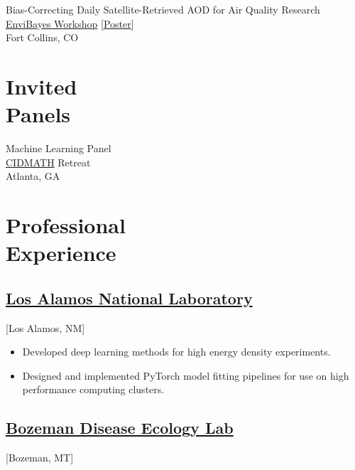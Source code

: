 \documentclass{wm_cv}
\begin{document}
Bias-Correcting Daily Satellite-Retrieved AOD for Air Quality Research \hfill {}\\
\indent \quad \href{https://statistics.colostate.edu/envibayes-workshop/}{EnviBayes Workshop} [\href{https://www.wyattgmadden.com/files/posters/20230918envibayes/envibayes2023.pdf}{Poster}] \\ 
   \indent \quad Fort Collins, CO \\

\section{Invited \\ Panels}

Machine Learning Panel \hfill {} \\
    \indent \quad \href{https://www.cidmath.org/}{CIDMATH} Retreat \\
   \indent \quad Atlanta, GA \\

\section{Professional \\ Experience}

\subsection{\href{https://cnls.lanl.gov}{Los Alamos National Laboratory}}[Los Alamos, NM]
\begin{positions}
\end{positions}
\begin{itemize}
  \item Developed deep learning methods for high energy density experiments.
  \item Designed and implemented PyTorch model fitting pipelines for use on high performance computing clusters.
\end{itemize}

\subsection{\href{http://bzndiseaselab.org/}{Bozeman Disease Ecology Lab}}[Bozeman, MT]
\begin{positions}
\end{positions}
\end{document}
